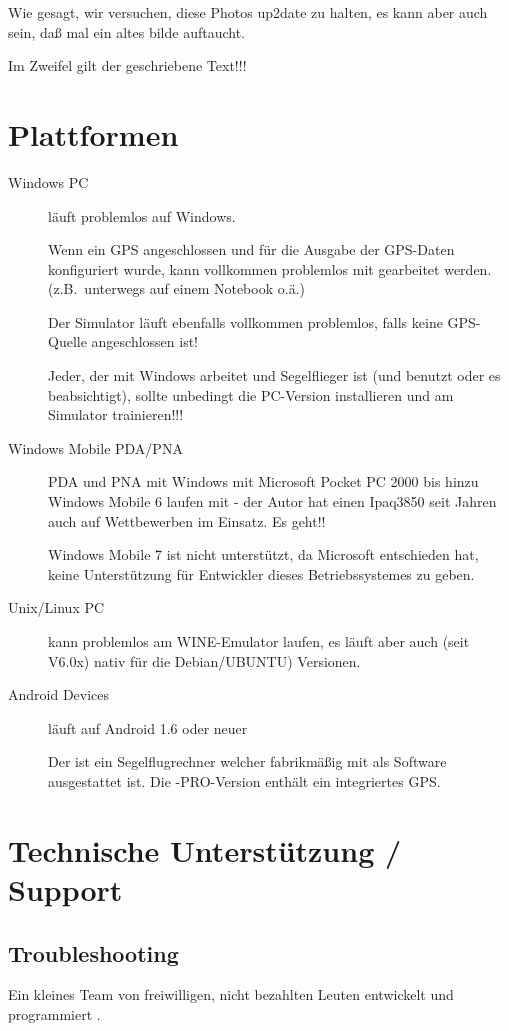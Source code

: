 Wie gesagt, wir versuchen, diese Photos up2date zu halten, es kann aber auch sein, daß mal ein altes bilde auftaucht.

Im Zweifel gilt der geschriebene Text!!!

\section{Plattformen}
\begin{description}
\item[Windows PC]
\xc läuft problemlos auf Windows.

Wenn ein GPS angeschlossen und für die Ausgabe der GPS-Daten konfiguriert wurde, kann vollkommen problemlos mit \xc gearbeitet
werden.  (z.B.\ unterwegs auf einem Notebook o.ä.)

Der Simulator läuft ebenfalls vollkommen problemlos, falls keine GPS-Quelle angeschlossen ist!

Jeder, der mit Windows arbeitet und Segelflieger ist (und \xc benutzt oder es beabsichtigt), sollte unbedingt die
PC-Version installieren und am Simulator trainieren!!!
\item[Windows Mobile PDA/PNA]
PDA und PNA mit Windows mit Microsoft Pocket PC 2000 bis hinzu Windows Mobile 6 laufen mit \xc - der Autor hat einen Ipaq3850 seit Jahren
auch auf Wettbewerben im Einsatz. Es geht!!

Windows Mobile 7 ist nicht unterstützt, da Microsoft entschieden hat, keine Unterstützung für Entwickler dieses
Betriebssystemes zu geben.
\item[Unix/Linux PC]
\xc kann problemlos am WINE-Emulator laufen, es läuft aber auch (seit V6.0x) nativ für die Debian/UBUNTU) Versionen.
\item[Android Devices] \xc läuft auf Android 1.6 oder neuer
\item[\al] Der \al ist ein Segelflugrechner welcher fabrikmäßig mit \xc als Software ausgestattet ist.
Die \al-PRO-Version enthält ein integriertes GPS.
\end{description}


\section{Technische Unterstützung / Support}

\subsection*{Troubleshooting}
Ein kleines Team von freiwilligen, nicht bezahlten Leuten entwickelt und programmiert \xc.


